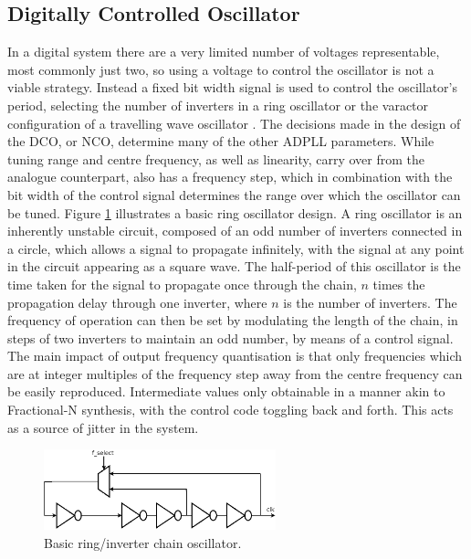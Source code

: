 \subsection{Digitally Controlled Oscillator}
In a digital system there are a very limited number of voltages representable, most commonly just two, so using a voltage to control the oscillator is not a viable strategy. Instead a fixed bit width signal is used to control the oscillator's period, selecting the number of inverters in a ring oscillator or the varactor configuration of a travelling wave oscillator \cite{chen2011rotary}. The decisions made in the design of the \ac{DCO}, or \ac{NCO}, determine many of the other \ac{ADPLL} parameters. While tuning range and centre frequency, as well as linearity, carry over from the analogue counterpart,  also has a frequency step, which in combination with the bit width of the control signal determines the range over which the oscillator can be tuned. Figure \ref{fig:my_ring} illustrates a basic ring oscillator design. A ring oscillator is an inherently unstable circuit, composed of an odd number of inverters connected in a circle, which allows a signal to propagate infinitely, with the signal at any point in the circuit appearing as a square wave. The half-period of this oscillator is the time taken for the signal to propagate once through the chain, $n$ times the propagation delay through one inverter, where $n$ is the number of inverters. The frequency of operation can then be set by modulating the length of the chain, in steps of two inverters to maintain an odd number, by means of a control signal. The main impact of output frequency quantisation is that only frequencies which are at integer multiples of the frequency step away from the centre frequency can be easily reproduced. Intermediate values only obtainable in a manner akin to Fractional-N synthesis, with the control code toggling back and forth. This acts as a source of jitter in the system.
\begin{figure}[h]
	\centering
	\includegraphics[width=0.6\textwidth]{../inverter_chain}
	\caption[Basic Ring/Inverter Chain Oscillator]{Basic ring/inverter chain oscillator.}
	\label{fig:my_ring}
\end{figure}

